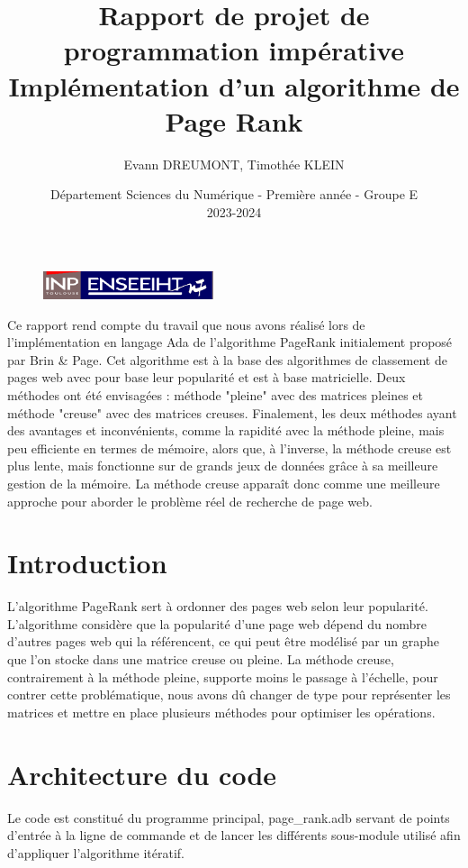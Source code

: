\documentclass{NewTeX}
\title{\vspace{4cm} \textbf{Rapport de projet de programmation impérative} \\ Implémentation d'un algorithme de Page Rank}
\author{Evann DREUMONT, Timothée KLEIN }
\date{\vspace{7cm} Département Sciences du Numérique - Première année - Groupe E \\ 2023-2024}
\begin{document}
\begin{figure}[t]
    \centering
    \includegraphics[width=5cm]{inp_n7.png}
\end{figure}

\maketitle

\newpage

Ce rapport rend compte du travail que nous avons réalisé lors de l'implémentation en langage Ada de l'algorithme PageRank initialement proposé par Brin \& Page. Cet algorithme est à la base des algorithmes de classement de pages web avec pour base leur popularité et est à base matricielle. Deux méthodes ont été envisagées : méthode "pleine" avec des matrices pleines et méthode "creuse" avec des matrices creuses. Finalement, les deux méthodes ayant des avantages et inconvénients, comme la rapidité avec la méthode pleine, mais peu efficiente en termes de mémoire, alors que, à l'inverse, la méthode creuse est plus lente, mais fonctionne sur de grands jeux de données grâce à sa meilleure gestion de la mémoire. La méthode creuse apparaît donc comme une meilleure approche pour aborder le problème réel de recherche de page web.

\tableofcontents

\newpage

\section{Introduction}
L'algorithme PageRank sert à ordonner des pages web selon leur popularité. L'algorithme considère que la popularité d'une page web dépend du nombre d'autres pages web qui la référencent, ce qui peut être modélisé par un graphe que l'on stocke dans une matrice creuse ou pleine. La méthode creuse, contrairement à la méthode pleine, supporte moins le passage à l'échelle, pour contrer cette problématique, nous avons dû changer de type pour représenter les matrices et mettre en place plusieurs méthodes pour optimiser les opérations.

\section{Architecture du code}
Le code est constitué du programme principal, page\_rank.adb servant de points d'entrée à la ligne de commande et de lancer les différents sous-module utilisé afin d'appliquer l'algorithme itératif.
\end{document}
